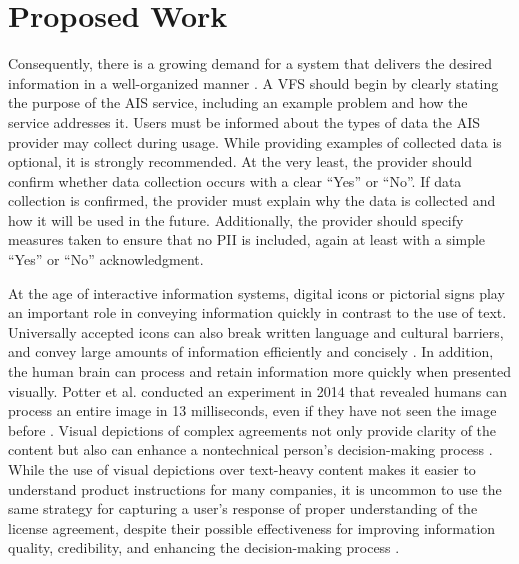 \documentclass[manuscript,review,anonymous]{acmart}
\begin{document}
\section{Proposed Work}
	Consequently, there is a growing demand for a system that delivers the desired information in a well-organized manner \cite{Hyun2022}.
	A VFS should begin by clearly stating the purpose of the AIS service, including an example problem and how the service addresses it. Users must be informed about the types of data the AIS provider may collect during usage. While providing examples of collected data is optional, it is strongly recommended. At the very least, the provider should confirm whether data collection occurs with a clear \enquote{Yes} or \enquote{No}. If data collection is confirmed, the provider must explain why the data is collected and how it will be used in the future. Additionally, the provider should specify measures taken to ensure that no PII is included, again at least with a simple \enquote{Yes} or \enquote{No} acknowledgment.

	At the age of interactive information systems, digital icons or pictorial signs play an important role in conveying information quickly in contrast to the use of text. Universally accepted icons can also break written language and cultural barriers, and convey large amounts of information efficiently and concisely \cite{COLLAUD2022102290} \cite{doi:10.1177/2041669518780807} \cite{doi:10.1177/2041669518780807}. In addition, the human brain can process and retain information more quickly when presented visually. Potter et al. conducted an experiment in 2014 that revealed humans can process an entire image in 13 milliseconds, even if they have not seen the image before \cite{Potter2014-ih}. Visual depictions of complex agreements not only provide clarity of the content but also can enhance a nontechnical person's decision-making process \cite{suters_emergence_2023, kim_impact_2021}. While the use of visual depictions over text-heavy content makes it easier to understand product instructions for many companies, it is uncommon to use the same strategy for capturing a user's response of proper understanding of the license agreement, despite their possible effectiveness for improving information quality, credibility, and enhancing the decision-making process \cite{kim_impact_2021}.
\end{document}
